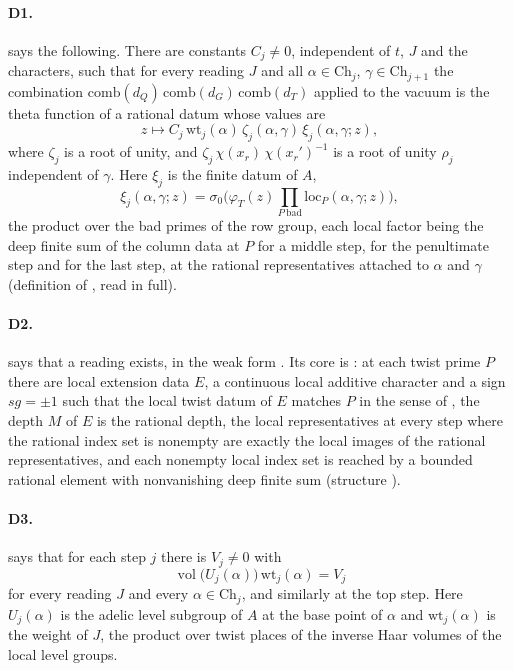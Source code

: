 \documentclass[11pt]{article}
\newcommand{\vol}{\operatorname{vol}}
\theoremstyle{definition}
\theoremstyle{remark}
\begin{document}
\paragraph{D1.}  says the following. There are constants $C_j\ne0$, independent of $t$, $J$ and the characters, such that for every reading $J$ and all $\alpha\in\mathrm{Ch}_j$, $\gamma\in\mathrm{Ch}_{j+1}$ the combination $\mathrm{comb}(d_Q)\,\mathrm{comb}(d_G)\,\mathrm{comb}(d_T)$ applied to the vacuum is the theta function of a rational datum whose values are
\[
z\longmapsto C_j\,\mathrm{wt}_j(\alpha)\,\zeta_j(\alpha,\gamma)\,\xi_j(\alpha,\gamma;z),
\]
where $\zeta_j$ is a root of unity, and $\zeta_j\,\chi(x_r)\,\chi(x_r')^{-1}$ is a root of unity $\rho_j$ independent of $\gamma$. Here $\xi_j$ is the finite datum of $A$,
\begin{equation}\label{eq:xi}
\xi_j(\alpha,\gamma;z)=\sigma_0\Big(\varphi_T(z)\prod_{P\ \mathrm{bad}}\mathrm{loc}_P(\alpha,\gamma;z)\Big),
\end{equation}
the product over the bad primes of the row group, each local factor being the deep finite sum  of the column data at $P$ for a middle step,  for the penultimate step and  for the last step, at the rational representatives attached to $\alpha$ and $\gamma$ (definition of , read in full).

\paragraph{D2.}  says that a reading exists, in the weak form . Its core is : at each twist prime $P$ there are local extension data $E$, a continuous local additive character and a sign $sg=\pm1$ such that the local twist datum of $E$ matches $P$ in the sense of , the depth $M$ of $E$ is the rational depth, the local representatives at every step where the rational index set is nonempty are exactly the local images of the rational representatives, and each nonempty local index set is reached by a bounded rational element with nonvanishing deep finite sum (structure ).

\paragraph{D3.}  says that for each step $j$ there is $V_j\ne0$ with
\[
\vol\big(U_j(\alpha)\big)\,\mathrm{wt}_j(\alpha)=V_j
\]
for every reading $J$ and every $\alpha\in\mathrm{Ch}_j$, and similarly at the top step. Here $U_j(\alpha)$ is the adelic level subgroup of $A$ at the base point of $\alpha$ and $\mathrm{wt}_j(\alpha)$ is the weight of $J$, the product over twist places of the inverse Haar volumes of the local level groups.
\end{document}
